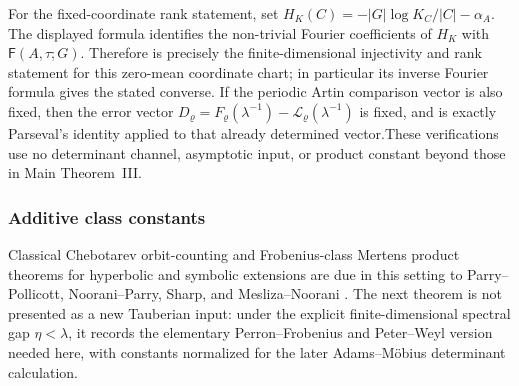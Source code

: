 \documentclass[11pt,a4paper]{amsart}
\theoremstyle{plain}
\theoremstyle{definition}
\theoremstyle{remark}
\begin{document}
  For the fixed-coordinate rank statement, set
  \(H_K(C)=-|G|\log K_C/|C|-\alpha_A\).  The displayed formula identifies the
  non-trivial Fourier coefficients of \(H_K\) with
  \(\mathsf F(A,\tau;G)\).  Therefore
   is precisely the
  finite-dimensional injectivity and rank statement for this zero-mean
  coordinate chart; in particular its inverse Fourier formula gives the stated
  converse.  If the periodic Artin comparison vector is also fixed, then the
  error vector
  \(D_\varrho=F_\varrho(\lambda^{-1})-
  \mathcal L_\varrho(\lambda^{-1})\) is fixed, and
   is exactly Parseval's identity applied to
  that already determined vector.These verifications use no determinant channel, asymptotic input, or product
constant beyond those in Main Theorem~III.

\subsubsection{Additive class constants}

Classical Chebotarev orbit-counting and Frobenius-class Mertens product
theorems for hyperbolic and symbolic extensions are due in this setting to
Parry--Pollicott, Noorani--Parry, Sharp, and Mesliza--Noorani
\cite{ParryPollicott1986Chebotarev,NooraniParry1992ChebotarevShifts,Sharp1991Mertens,MeslizaNoorani1999FrobeniusMertens}.  The next theorem is
not presented as a new Tauberian input: under the explicit finite-dimensional
spectral gap \(\eta<\lambda\), it records the elementary Perron--Frobenius and
Peter--Weyl version needed here, with constants normalized for the later
Adams--M\"obius determinant calculation.
\end{document}
